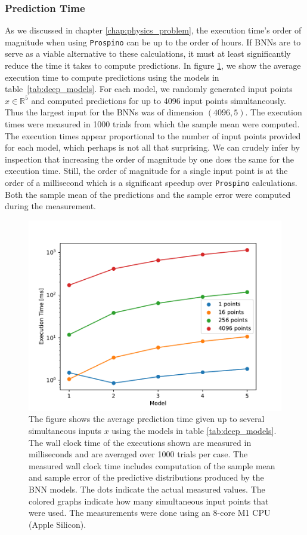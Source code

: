 \subsubsection{Prediction Time}
As we discussed in chapter \ref{chap:physics_problem}, the execution time's order of magnitude when using {\tt Prospino} can be up to the order of hours. 
If BNNs are to serve as a viable alternative to these calculations, it must at least significantly reduce the time it takes to compute predictions. In figure \ref{fig:prediction_time}, we 
show the average execution time to compute predictions using the models in table~\ref{tab:deep_models}.
For each model, we randomly generated input points $x\in \mathbb{R}^5$ and computed predictions for up to 4096 input points simultaneously.
Thus the largest input for the BNNs was of dimension $(4096, 5)$. The execution times were measured in 1000 trials from which the sample mean were computed.
The execution times appear proportional to the number of input points provided for each model, which perhaps is not all that surprising. We can crudely infer by inspection that increasing the order of magnitude by one does the same for the execution time. Still, the order of magnitude for a single input point is at the order of a millisecond which is a significant speedup over {\tt Prospino} calculations. Both the sample mean of the predictions and the sample error were computed during the measurement. 

\begin{figure}[H]
    \centering
    \includegraphics[scale=0.7]{figures/prediction_time/prediction_time.pdf}
    \caption{The figure shows the average prediction time given up to several simultaneous inputs $x$ using the models in table \ref{tab:deep_models}. The wall clock time of the executions shown are measured in milliseconds and are averaged over 1000 trials per case. The measured wall clock time includes computation of the sample mean and sample error of the predictive distributions produced by the BNN models. The dots indicate the actual measured values. The colored graphs indicate how many simultaneous input points that were used. The measurements were done using an 8-core M1 CPU (Apple Silicon).
    }
    \label{fig:prediction_time}
\end{figure}

